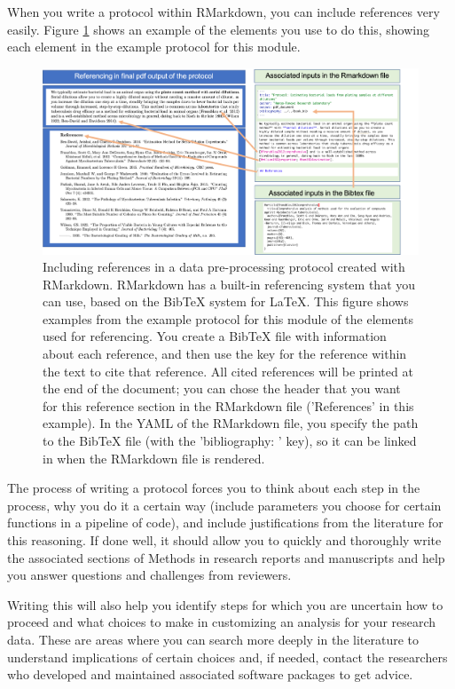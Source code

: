 \documentclass[]{tufte-book}
\begin{document}
When you write a protocol within RMarkdown, you can include references
very easily. Figure \ref{fig:protocolreferences} shows an example of the
elements you use to do this, showing each element in the example protocol for
this module.

\begin{figure}
\includegraphics[width=\textwidth]{figures/protocol_references} \caption[Including references in a data pre-processing protocol created with RMarkdown]{Including references in a data pre-processing protocol created with RMarkdown. RMarkdown has a built-in referencing system that you can use, based on the BibTeX system for LaTeX. This figure shows examples from the example protocol for this module of the elements used for referencing. You create a BibTeX file with information about each reference, and then use the key for the reference within the text to cite that reference. All cited references will be printed at the end of the document; you can chose the header that you want for this reference section in the RMarkdown file ('References' in this example). In the YAML of the RMarkdown file, you specify the path to the BibTeX file (with the 'bibliography: ' key), so it can be linked in when the RMarkdown file is rendered.}\label{fig:protocolreferences}
\end{figure}

The process of writing a protocol forces you to think about each step in the
process, why you do it a certain way (include parameters you choose for
certain functions in a pipeline of code), and include justifications from
the literature for this reasoning. If done well, it should allow you to
quickly and thoroughly write the associated sections of Methods in research
reports and manuscripts and help you answer questions and challenges from
reviewers.

Writing this will also help you identify steps for which you are uncertain
how to proceed and what choices to make in customizing an analysis for your
research data. These are areas where you can search more deeply in the
literature to understand implications of certain choices and, if needed,
contact the researchers who developed and maintained associated software
packages to get advice.
\end{document}
